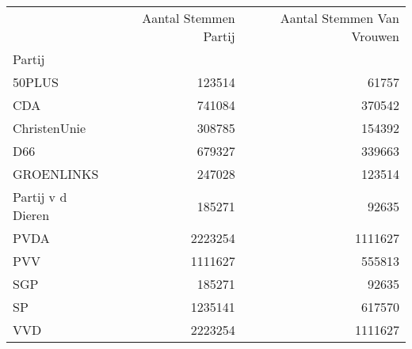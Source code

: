 \begin{tabular}{lrr}
\toprule
{} &  Aantal Stemmen Partij &  Aantal Stemmen Van Vrouwen \\
Partij                &                        &                             \\
\midrule
50PLUS                &                 123514 &                       61757 \\
CDA                   &                 741084 &                      370542 \\
ChristenUnie          &                 308785 &                      154392 \\
D66                   &                 679327 &                      339663 \\
GROENLINKS            &                 247028 &                      123514 \\
Partij v d Dieren &                 185271 &                       92635 \\
PVDA                  &                2223254 &                     1111627 \\
PVV                   &                1111627 &                      555813 \\
SGP                   &                 185271 &                       92635 \\
SP                    &                1235141 &                      617570 \\
VVD                   &                2223254 &                     1111627 \\
\bottomrule
\end{tabular}
